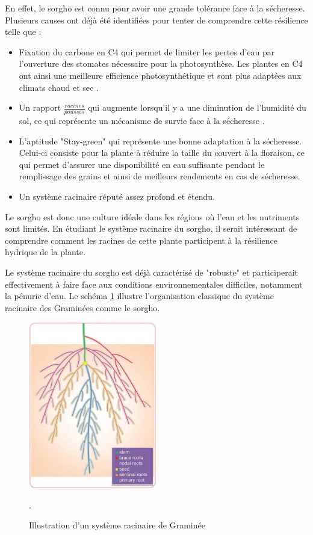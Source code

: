 En effet, le sorgho est connu pour avoir une grande tolérance face à la sécheresse. Plusieurs causes ont déjà été identifiées pour tenter de comprendre cette résilience telle que :
\begin{itemize}
    \item Fixation du carbone en C4 qui permet de limiter les pertes d'eau par l'ouverture des stomates nécessaire pour la photosynthèse. Les plantes en C4 ont ainsi une meilleure efficience photosynthétique et sont plus adaptées aux climats chaud et sec \citep{shanker_c4_2011}.
    \item Un rapport $\frac{racines}{pousses}$ qui augmente lorsqu'il y a une diminution de l'humidité du sol, ce qui représente un mécanisme de survie face à la sécheresse \citep{mwamahonje_drought_2021}.
    \item L'aptitude "Stay-green" qui représente une bonne adaptation à la sécheresse.
    Celui-ci consiste pour la plante à réduire la taille du couvert à la floraison, ce qui permet d'assurer une disponibilité en eau suffisante pendant le remplissage des grains et ainsi de meilleurs rendements en cas de sécheresse.
    \item Un système racinaire réputé assez profond et étendu.
\end{itemize}
Le sorgho est donc une culture idéale dans les régions où l'eau et les nutriments sont limités. 
En étudiant le système racinaire du sorgho, il serait intéressant de comprendre comment les racines de cette plante participent à la résilience hydrique de la plante.
\newline

Le système racinaire du sorgho est déjà caractérisé de "robuste" et participerait effectivement à faire face aux conditions environnementales difficiles, notamment la pénurie d'eau.
Le schéma \ref{fig:RSA} illustre l'organisation classique du système racinaire des Graminées comme le sorgho.

\begin{figure}[ht]
\centering
\includegraphics[width=0.5\textwidth]{Image/RSA.png}
\caption{Illustration d'un système racinaire de Graminée \citep{correa_soil_2019}}.
\label{fig:RSA}
\end{figure}

